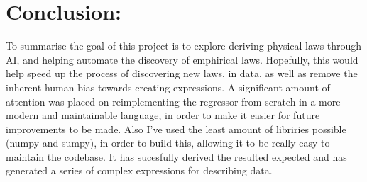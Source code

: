 \documentclass{article}
\begin{document}
\section{Conclusion: }

To summarise the goal of this project is to explore deriving physical laws through AI, and helping automate the discovery of emphirical laws. Hopefully, this would help speed up the process of discovering new laws, in data, as well as remove the inherent human bias towards creating expressions. A significant amount of attention was placed on reimplementing the regressor from scratch in a more modern and maintainable language, in order to make it easier for future improvements to be made. Also I've used the least amount of libriries possible (numpy and sumpy), in order to build this, allowing it to be really easy to maintain the codebase. It has sucesfully derived the resulted expected and has generated a series of complex expressions for describing data. \\
\end{document}

